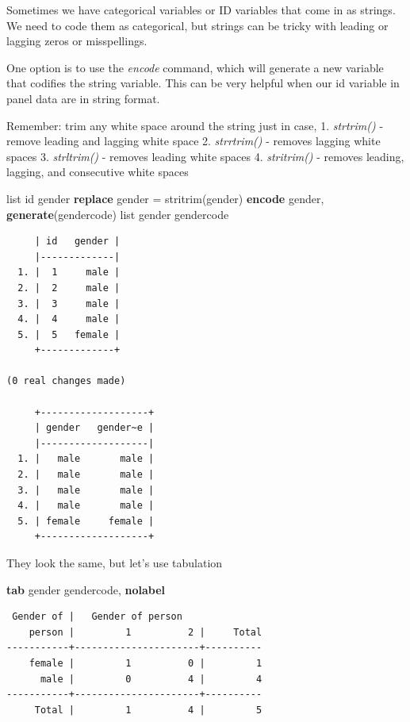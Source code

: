 \documentclass[
]{book}
\newenvironment{Shaded}{\begin{snugshade}}{\end{snugshade}}
\newcommand{\KeywordTok}[1]{\textcolor[rgb]{0.13,0.29,0.53}{\textbf{#1}}}
\newcommand{\NormalTok}[1]{#1}
\newcommand{\OtherTok}[1]{\textcolor[rgb]{0.56,0.35,0.01}{#1}}
\begin{document}
Sometimes we have categorical variables or ID variables that come in as strings. We need to code them as categorical, but strings can be tricky with leading or lagging zeros or misspellings.

One option is to use the \emph{encode} command, which will generate a new variable that codifies the string variable. This can be very helpful when our id variable in panel data are in string format.

Remember: trim any white space around the string just in case,
1. \emph{strtrim()} - remove leading and lagging white space
2. \emph{strrtrim()} - removes lagging white spaces
3. \emph{strltrim()} - removes leading white spaces
4. \emph{stritrim()} - removes leading, lagging, and consecutive white spaces

\begin{Shaded}
\begin{Highlighting}[]
\OtherTok{list}\NormalTok{ id gender}
\KeywordTok{replace}\NormalTok{ gender = stritrim(gender)}
\KeywordTok{encode}\NormalTok{ gender, }\KeywordTok{generate}\NormalTok{(gendercode)}
\OtherTok{list}\NormalTok{ gender gendercode}
\end{Highlighting}
\end{Shaded}

\begin{verbatim}
     | id   gender |
     |-------------|
  1. |  1     male |
  2. |  2     male |
  3. |  3     male |
  4. |  4     male |
  5. |  5   female |
     +-------------+

(0 real changes made)

     +-------------------+
     | gender   gender~e |
     |-------------------|
  1. |   male       male |
  2. |   male       male |
  3. |   male       male |
  4. |   male       male |
  5. | female     female |
     +-------------------+
\end{verbatim}

They look the same, but let's use tabulation

\begin{Shaded}
\begin{Highlighting}[]
\KeywordTok{tab}\NormalTok{ gender gendercode, }\KeywordTok{nolabel}
\end{Highlighting}
\end{Shaded}

\begin{verbatim}
 Gender of |   Gender of person
    person |         1          2 |     Total
-----------+----------------------+----------
    female |         1          0 |         1 
      male |         0          4 |         4 
-----------+----------------------+----------
     Total |         1          4 |         5 
\end{verbatim}
\end{document}
